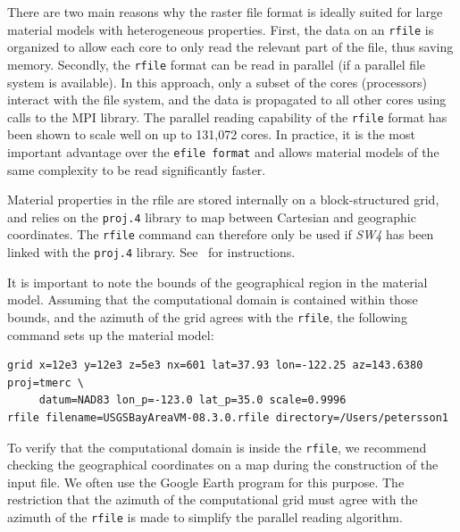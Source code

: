 \documentclass[11pt]{report}
\begin{document}
There are two main reasons why the raster file format is ideally suited for large material models
with heterogeneous properties. First, the data on an {\tt rfile} is organized to allow each core to
only read the relevant part of the file, thus saving memory. Secondly, the {\tt rfile} format can be
read in parallel (if a parallel file system is available). In this approach, only a subset of the
cores (processors) interact with the file system, and the data is propagated to all other cores
using calls to the MPI library. The parallel reading capability of the {\tt rfile}
format has been shown to scale well on up to 131,072 cores. In practice, it is the most important
advantage over the {\tt efile format} and allows material models of the same complexity to be read
significantly faster. 

Material properties in the rfile are stored internally on a block-structured grid, and relies on the
\verb+proj.4+ library to map between Cartesian and geographic coordinates. The {\tt rfile} command
can therefore only be used if \emph{SW4} has been linked with the \verb+proj.4+
library. See~\cite{SW4-install} for instructions.

It is important to note the bounds of the geographical region in the material model. Assuming that
the computational domain is contained within those bounds, and the azimuth of the grid agrees with
the \verb+rfile+, the following command sets up the material model:
\begin{verbatim}
grid x=12e3 y=12e3 z=5e3 nx=601 lat=37.93 lon=-122.25 az=143.6380 proj=tmerc \
     datum=NAD83 lon_p=-123.0 lat_p=35.0 scale=0.9996
rfile filename=USGSBayAreaVM-08.3.0.rfile directory=/Users/petersson1
\end{verbatim}
To verify that the computational domain is inside the \verb+rfile+, we recommend checking the
geographical coordinates on a map during the construction of the input file. We often use the Google Earth
program for this purpose. The restriction that the azimuth of the computational grid
must agree with the azimuth of the \verb+rfile+ is made to simplify the parallel reading algorithm.
\end{document}
